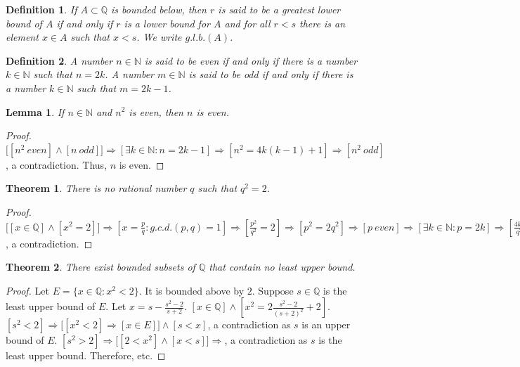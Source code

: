 \documentclass[12pt,oneside]{book}
\theoremstyle{mystyle}
\newtheorem{theorem}{Theorem}[section]
\newtheorem{definition}{Definition}[section]
\newtheorem{lemma}{Lemma}[section]
\begin{document}
\begin{definition}
If $A\subset \mathbb{Q}$ is bounded below, then $r$ is said to be a greatest lower bound of $A$ if and only if $r$ is a lower bound for $A$ and for all $r<s$ there is an element $x\in A$ such that $x<s$. We write $g.l.b.(A)$.
\end{definition}

\begin{definition}
A number $n\in \mathbb{N}$ is said to be even if and only if there is a number $k\in \mathbb{N}$ such that $n=2k$. A number $m\in \mathbb{N}$ is said to be odd if and only if there is a number $k\in \mathbb{N}$ such that $m=2k-1$.
\end{definition}

\begin{lemma}
If $n\in \mathbb{N}$ and $n^2$ is even, then $n$ is even.
\end{lemma}
\begin{proof}
$\big[[n^2\ even]\land [n\ odd]\big]\Rightarrow [\exists k\in \mathbb{N}:n=2k-1]\Rightarrow [n^2 = 4k(k-1)+1]\Rightarrow [n^2\ odd]$, a contradiction. Thus, $n$ is even.
\end{proof}

\begin{theorem}
There is no rational number $q$ such that $q^2 = 2$.
\end{theorem}
\begin{proof}
$\big[[x\in \mathbb{Q}]\land [x^2=2]\big]\Rightarrow [x= \frac{p}{q}:g.c.d.(p,q)=1]\Rightarrow [\frac{p^2}{q^2}= 2]\Rightarrow [p^2 = 2q^2]\Rightarrow [p\ even]\Rightarrow [\exists k\in \mathbb{N}:p=2k]\Rightarrow [\frac{4k^2}{q^2}=2]\Rightarrow [q^2 = 2k^2]\Rightarrow [q\ even]\Rightarrow [g.c.d.(p,q)\geq 2]$, a contradiction.
\end{proof}

\begin{theorem}
There exist bounded subsets of $\mathbb{Q}$ that contain no least upper bound.
\end{theorem}
\begin{proof}
Let $E=\{x\in \mathbb{Q}:x^2 < 2\}$. It is bounded above by $2$. Suppose $s\in \mathbb{Q}$ is the least upper bound of $E$. Let $x = s - \frac{s^2-2}{s+2}$. $[x\in \mathbb{Q}] \land [x^2 = 2\frac{s^2-2}{(s+2)^2}+2]$. $[s^2<2]\Rightarrow \big[[x^2<2 ]\Rightarrow [x\in E]\big]\land [s<x]$, a contradiction as $s$ is an upper bound of $E$. $[s^2>2]\Rightarrow \big[[2<x^2 ]\land [x<s]\big]\Rightarrow$, a contradiction as $s$ is the least upper bound. Therefore, etc.
\end{proof}
\end{document}
